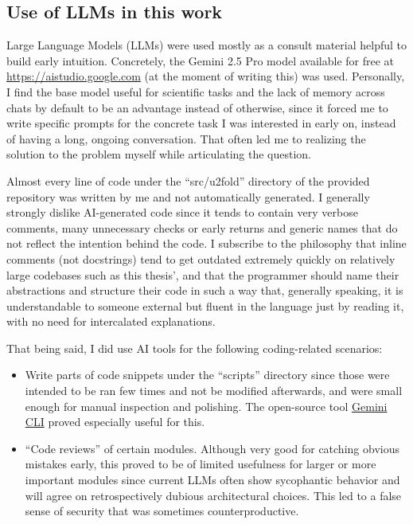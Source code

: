 \documentclass[twocolumn,twoside,a4paper,10pt]{IEEEtran}
\begin{document}
\subsection{Use of LLMs in this work}
Large Language Models (LLMs) were used mostly as a consult material helpful to build early intuition. Concretely, the Gemini 2.5 Pro model available for free at \href{https://aistudio.google.com}{https://aistudio.google.com} (at the moment of writing this) was used. Personally, I find the base model useful for scientific tasks and the lack of memory across chats by default to be an advantage instead of otherwise, since it forced me to write specific prompts for the concrete task I was interested in early on, instead of having a long, ongoing conversation. That often led me to realizing the solution to the problem myself while articulating the question.

Almost every line of code under the ``src/u2fold'' directory of the provided repository was written by me and not automatically generated. I generally strongly dislike AI-generated code since it tends to contain very verbose comments, many unnecessary checks or early returns and generic names that do not reflect the intention behind the code. I subscribe to the philosophy that inline comments (not docstrings) tend to get outdated extremely quickly on relatively large codebases such as this thesis', and that the programmer should name their abstractions and structure their code in such a way that, generally speaking, it is understandable to someone external but fluent in the language just by reading it, with no need for intercalated explanations.

That being said, I did use AI tools for the following coding-related scenarios:
\begin{itemize}
  \item Write parts of code snippets under the ``scripts'' directory since those were intended to be ran few times and not be modified afterwards, and were small enough for manual inspection and polishing. The open-source tool \href{https://github.com/google-gemini/gemini-cli}{Gemini CLI} proved especially useful for this.
  \item ``Code reviews'' of certain modules. Although very good for catching obvious mistakes early, this proved to be of limited usefulness for larger or more important modules since current LLMs often show sycophantic behavior and will agree on retrospectively dubious architectural choices. This led to a false sense of security that was sometimes counterproductive.
\end{itemize}
\end{document}
